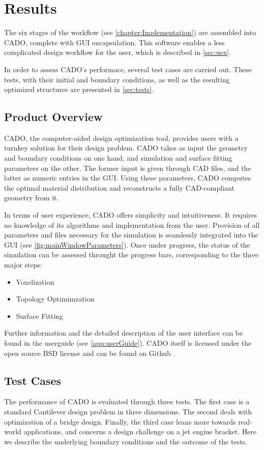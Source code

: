 \chapter{Results}
The six stages of the workflow (see \autoref{chapter:Implementation}) are assembled into CADO, complete with GUI encapsulation. This software enables a less complicated design workflow for the user, which is described in \autoref{sec:uex}. 

In order to assess CADO's performace, several test cases are carried out. These tests, with their initial and boundary conditions, as well as the resulting optimized structures are presented in \autoref{sec:tests}.

\section{Product Overview}
\label{sec:uex}
CADO, the computer-aided design optimization tool, provides users with a turnkey solution for their design problem. CADO takes as input the geometry and boundary conditions on one hand, and simulation and surface fitting parameters on the other. The former input is given through CAD files, and the latter as numeric entries in the GUI. Using these parameters, CADO computes the optimal material distribution and reconstructs a fully CAD-compliant geometry from it.

In terms of user experience, CADO offers simplicity and intuitiveness. It requires no knowledge of its algorithms and implementation from the user. Provision of all parameters and files necessary for the simulation is seamlessly integrated into the GUI (see \autoref{fig:mainWindowParameters}). Once under progress, the status of the simulation can be assessed throught the progress bars, corresponding to the three major steps:
\begin{itemize}
\item Voxelization
\item Topology Optimimzation
\item Surface Fitting
\end{itemize}
Further information and the detailed description of the user interface can be found in the userguide (see \autoref{app:userGuide}). CADO itself is licensed under the open source BSD license and can be found on Github \cite{CADOGit}.


\section{Test Cases}
\label{sec:tests}
The performance of CADO is evaluated through three tests. The first case is a standard Cantilever design problem in three dimensions. The second deals with optimization of a bridge design. Finally, the third case leans more towards real-world applications, and concerns a design challenge on a jet engine bracket. Here we describe the underlying boundary conditions and the outcome of the tests.
\newpage

